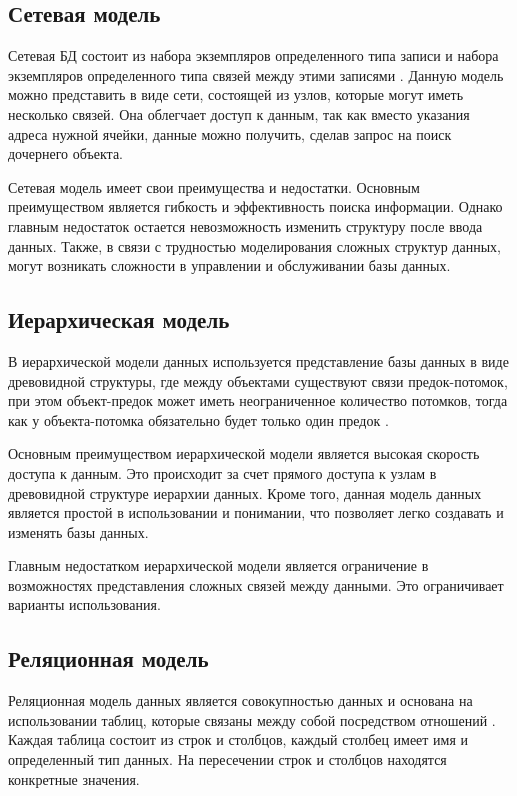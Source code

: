 \subsection{Сетевая модель}

Сетевая БД состоит из набора экземпляров определенного типа записи и набора экземпляров определенного типа связей
между этими записями \cite{setevy}. Данную модель можно представить в виде сети, состоящей из узлов, которые могут иметь несколько связей. Она облегчает доступ к данным, так как вместо указания адреса нужной ячейки, данные можно получить, сделав запрос на поиск дочернего объекта.

Сетевая модель имеет свои преимущества и недостатки. Основным преимуществом является гибкость и эффективность поиска информации. Однако главным недостаток остается
невозможность изменить структуру после ввода данных. Также, в связи с трудностью моделирования сложных структур данных, могут возникать сложности в управлении и обслуживании базы данных.

\subsection{Иерархическая модель}

В иерархической модели данных используется представление базы данных в
виде древовидной структуры, где между объектами существуют связи предок-потомок, при этом объект-предок может иметь неограниченное количество потомков, тогда как у объекта-потомка обязательно будет только один предок \cite{ierarch}. 

Основным преимуществом иерархической модели является высокая скорость доступа к данным. Это происходит за счет прямого доступа к узлам в древовидной структуре иерархии данных. Кроме того, данная модель данных является простой в использовании и понимании, что позволяет легко создавать и изменять базы данных.

Главным недостатком иерархической модели является ограничение в возможностях представления сложных связей между данными. Это ограничивает варианты использования.


\subsection{Реляционная модель}
Реляционная модель данных является совокупностью данных и основана на использовании таблиц, которые связаны между собой посредством отношений \cite{relyac}. Каждая таблица состоит из строк и столбцов, каждый столбец имеет имя и определенный тип данных. На
пересечении строк и столбцов находятся конкретные значения.

